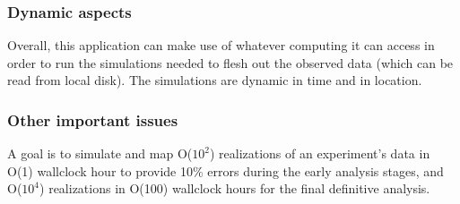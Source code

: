  \subsubsection*{Dynamic aspects}



Overall, this application can make use of whatever computing it can access in order to run the simulations needed to flesh out the observed data (which can be read from local disk).  The simulations are dynamic in time and in location.


 \subsubsection*{Other important issues}



A goal is to simulate and map O($10^2$) realizations of an experiment's data in O(1) wallclock hour to provide 10\% errors during the early analysis stages, and O($10^4$) realizations in O(100) wallclock hours for the final definitive analysis.


